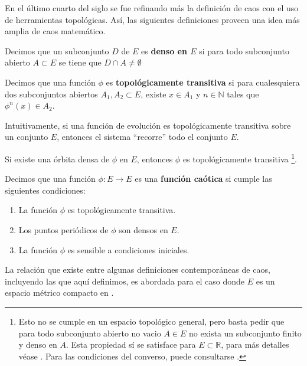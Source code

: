 \documentclass[../Main.tex]{subfiles}
\begin{document}
 En el último cuarto del siglo se fue refinando más la definición de caos con el uso de herramientas topológicas. Así, las siguientes definiciones proveen una idea más amplia de caos matemático.  
 \begin{definition}
 \label{}
     Decimos que un subconjunto $D$ de $E$ es \textbf{denso en $E$} si para todo subconjunto abierto $A\subset E$ se tiene que $D\cap A\neq \emptyset$
 \end{definition}
\begin{definition}
\label{}
    Decimos que una función $\phi$ es \textbf{topológicamente transitiva} si para cualesquiera dos subconjuntos abiertos $A_1,A_2\subset E$, existe $x\in A_1$ y $n\in \mathbb{N}$ tales que $\phi^n(x)\in A_2$.
\end{definition}
\begin{remark}
\label{}
Intuitivamente, si una función de evolución es topológicamente transitiva sobre un conjunto $E$, entonces el sistema ``recorre'' todo el conjunto $E$.
    \end{remark}
    \begin{remark}
    \label{}
    Si existe una órbita densa de $\phi$ en $E$, entonces $\phi$ es topológicamente transitiva \footnote{Esto no se cumple en un espacio topológico general, pero basta pedir que para todo subconjunto abierto no vacio $A\in E$ no exista un subconjunto finito y denso en $A$. Esta propiedad sí se satisface para $E\subset \mathbb{R}$, para más detalles véase \cite{Degirmenci2003}. Para las condiciones del converso, puede consultarse \cite{KingMendez2014}.}. 
\end{remark}
\begin{definition}\label{def:caos}
    Decimos que una función $\phi:E\rightarrow E$ es una \textbf{función caótica}\cite{devaney2021} si cumple las siguientes condiciones:
    \begin{enumerate}
            \item La función $\phi$ es topológicamente transitiva.
        \item Los puntos periódicos de $\phi$ son densos en $E$.
        \item La función $\phi$ es sensible a condiciones iniciales. 
    \end{enumerate}
\end{definition}

La relación que existe entre algunas definiciones contemporáneas de caos, incluyendo las que aquí definimos, es abordada para el caso donde $E$ es un espacio métrico compacto en \cite{Aulbach2001}.
\end{document}
